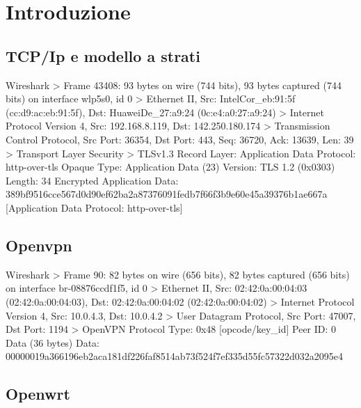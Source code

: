 
\chapter{Introduzione}


\section{TCP/Ip e modello a strati}







\begin{bashcode}{Wireshark}{}
> Frame 43408: 93 bytes on wire (744 bits), 93 bytes captured (744 bits) on interface wlp5s0, id 0
> Ethernet II, Src: IntelCor_eb:91:5f (cc:d9:ac:eb:91:5f), Dst: HuaweiDe_27:a9:24 (0c:e4:a0:27:a9:24)
> Internet Protocol Version 4, Src: 192.168.8.119, Dst: 142.250.180.174
> Transmission Control Protocol, Src Port: 36354, Dst Port: 443, Seq: 36720, Ack: 13639, Len: 39
> Transport Layer Security
    > TLSv1.3 Record Layer: Application Data Protocol: http-over-tls
            Opaque Type: Application Data (23)
            Version: TLS 1.2 (0x0303)
            Length: 34
            Encrypted Application Data: 389bf9516cce567d0d90ef62ba2a87376091fedb7f66f3b9e60e45a39376b1ae667a
            [Application Data Protocol: http-over-tls]
\end{bashcode}



\section{Openvpn}



\begin{bashcode}{Wireshark}{}
> Frame 90: 82 bytes on wire (656 bits), 82 bytes captured (656 bits) on interface br-08876ccdf1f5, id 0
> Ethernet II, Src: 02:42:0a:00:04:03 (02:42:0a:00:04:03), Dst: 02:42:0a:00:04:02 (02:42:0a:00:04:02)
> Internet Protocol Version 4, Src: 10.0.4.3, Dst: 10.0.4.2
> User Datagram Protocol, Src Port: 47007, Dst Port: 1194
> OpenVPN Protocol
        Type: 0x48 [opcode/key_id]
        Peer ID: 0
        Data (36 bytes)
            Data: 00000019a366196eb2aca181df226faf8514ab73f524f7ef335d55fc57322d032a2095e4
\end{bashcode}


\section{Openwrt}



